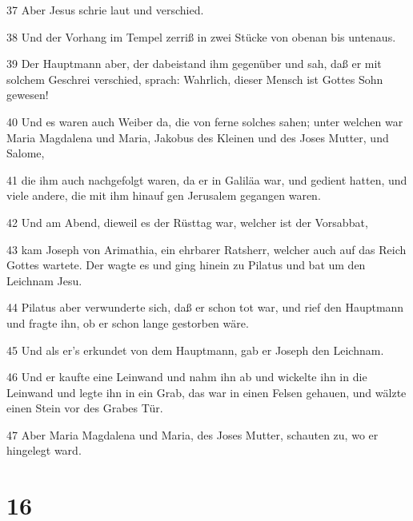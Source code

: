 \par 37 Aber Jesus schrie laut und verschied.
\par 38 Und der Vorhang im Tempel zerriß in zwei Stücke von obenan bis untenaus.
\par 39 Der Hauptmann aber, der dabeistand ihm gegenüber und sah, daß er mit solchem Geschrei verschied, sprach: Wahrlich, dieser Mensch ist Gottes Sohn gewesen!
\par 40 Und es waren auch Weiber da, die von ferne solches sahen; unter welchen war Maria Magdalena und Maria, Jakobus des Kleinen und des Joses Mutter, und Salome,
\par 41 die ihm auch nachgefolgt waren, da er in Galiläa war, und gedient hatten, und viele andere, die mit ihm hinauf gen Jerusalem gegangen waren.
\par 42 Und am Abend, dieweil es der Rüsttag war, welcher ist der Vorsabbat,
\par 43 kam Joseph von Arimathia, ein ehrbarer Ratsherr, welcher auch auf das Reich Gottes wartete. Der wagte es und ging hinein zu Pilatus und bat um den Leichnam Jesu.
\par 44 Pilatus aber verwunderte sich, daß er schon tot war, und rief den Hauptmann und fragte ihn, ob er schon lange gestorben wäre.
\par 45 Und als er's erkundet von dem Hauptmann, gab er Joseph den Leichnam.
\par 46 Und er kaufte eine Leinwand und nahm ihn ab und wickelte ihn in die Leinwand und legte ihn in ein Grab, das war in einen Felsen gehauen, und wälzte einen Stein vor des Grabes Tür.
\par 47 Aber Maria Magdalena und Maria, des Joses Mutter, schauten zu, wo er hingelegt ward.

\chapter{16}


